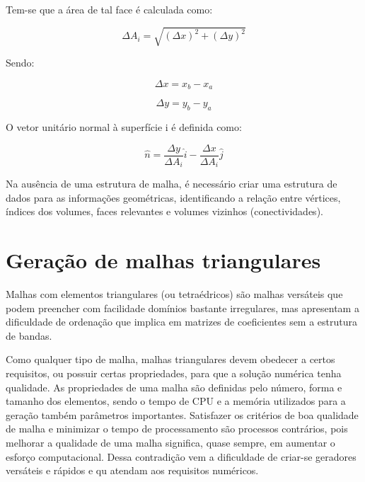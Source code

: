 Tem-se que a área de tal face é calculada como:

\begin{equation}
    \label{eq:6.11}
    \Delta A_i = \sqrt{(\Delta x)^2 + (\Delta y)^2}
\end{equation}

Sendo:

\begin{equation}
    \label{eq:6.12}
    \Delta x = x_b - x_a
\end{equation}

\begin{equation}
    \label{eq:6.13}
    \Delta y = y_b - y_a
\end{equation}

O vetor unitário normal à superfície i é definida como:

\begin{equation}
    \label{eq:6.14}
    \hat{n} = \frac{\Delta y}{\Delta A_i}\hat{i} - \frac{\Delta x}{\Delta A_i}\hat{j}
\end{equation}

Na ausência de uma estrutura de malha, é necessário criar uma estrutura de dados para as informações geométricas, identificando a relação entre vértices, índices dos volumes, faces relevantes e volumes vizinhos (conectividades).

\section{Geração de malhas triangulares}

Malhas com elementos triangulares (ou tetraédricos) são malhas versáteis que podem preencher com facilidade domínios bastante irregulares, mas apresentam a dificuldade de ordenação que implica em matrizes de coeficientes sem a estrutura de bandas.

Como qualquer tipo de malha, malhas triangulares devem obedecer a certos requisitos, ou possuir certas propriedades, para que a solução numérica tenha qualidade. As propriedades de uma malha são definidas pelo número, forma e tamanho dos elementos, sendo o tempo de CPU e a memória utilizados para a geração também parâmetros importantes. Satisfazer os critérios de boa qualidade de malha e minimizar o tempo de processamento são processos contrários, pois melhorar a qualidade de uma malha significa, quase sempre, em aumentar o esforço computacional. Dessa contradição vem a dificuldade de criar-se geradores versáteis e rápidos e qu atendam aos requisitos numéricos.

